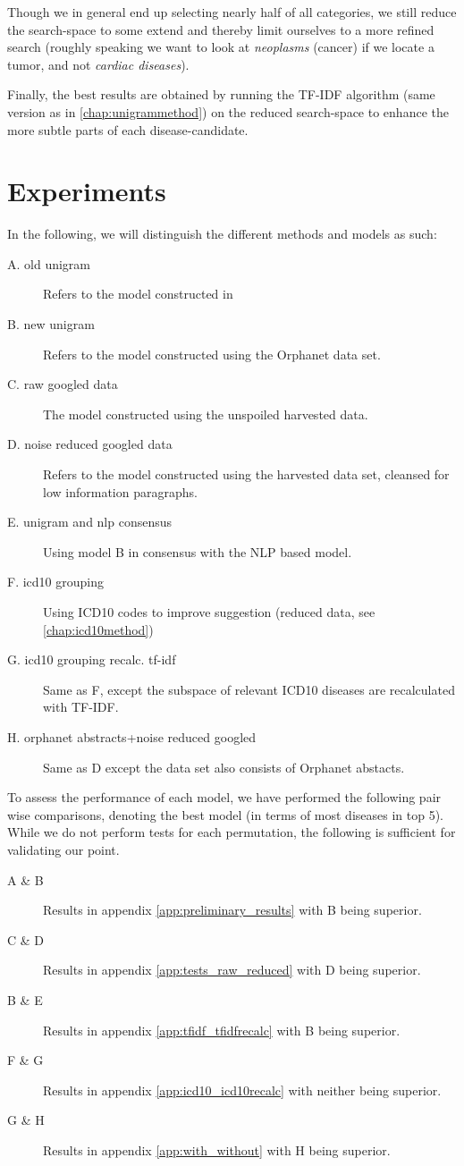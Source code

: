 \documentclass[10pt,letterpaper,two column,final]{article}
\begin{document}
Though we in general end up selecting nearly half of all categories, we
still reduce the search-space to some extend and thereby limit ourselves
to a more refined search (roughly speaking we want to look at \textit{neoplasms}
(cancer) if we locate a tumor, and not \textit{cardiac diseases}).

Finally, the best results are obtained by running the TF-IDF algorithm
(same version as in \ref{chap:unigrammethod}) on the reduced
search-space to enhance the more subtle parts of each disease-candidate.

\section{Experiments}
\label{chap:test}
In the following, we will distinguish the different methods and models
as such:
\begin{description}
\item[A. old unigram] Refers to the model constructed in
\cite{jensenandersen}
\item[B. new unigram] Refers to the model constructed using the Orphanet data
set.
\item[C. raw googled data] The model constructed using the unspoiled harvested data.
\item[D. noise reduced googled data] Refers to the model constructed using the
harvested data set, cleansed for low information paragraphs.
\item[E. unigram and nlp consensus] Using model B in consensus with the NLP based model.
\item[F. icd10 grouping] Using ICD10 codes to improve suggestion (reduced data, see \ref{chap:icd10method})
\item[G. icd10 grouping recalc. tf-idf] Same as F, except the subspace
of relevant ICD10 diseases are recalculated with TF-IDF.
\item[H. orphanet abstracts+noise reduced googled] Same as D except
the data set also consists of Orphanet abstacts.
\end{description}

To assess the performance of each model, we have performed the following
pair wise comparisons, denoting the best model (in terms of most
diseases in top 5). While we do not perform tests for each permutation,
the following is sufficient for validating our point.
\begin{description}
\item[A \& B] Results in appendix \ref{app:preliminary_results} with B being superior.
\item[C \& D] Results in appendix \ref{app:tests_raw_reduced} with D being superior.
\item[B \& E] Results in appendix \ref{app:tfidf_tfidfrecalc} with B being superior.
\item[F \& G] Results in appendix \ref{app:icd10_icd10recalc} with neither being superior.
\item[G \& H] Results in appendix \ref{app:with_without} with H being superior.
\end{description}
\end{document}

